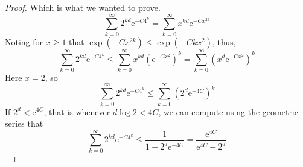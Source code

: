 \documentclass[a4paper,oneside,10pt]{amsproc}
\theoremstyle{remark}
\renewcommand{\leq}{\leqslant}
\renewcommand{\leq}{\leqslant}
\renewcommand{\geq}{\geqslant}
\newcommand{\e}{\mathrm{e}} %
\renewcommand{\leq}{\leqslant}%
\renewcommand{\geq}{\geqslant}%
\begin{document}
\begin{proof}
  Which is what we wanted to prove.
  \begin{equation*}
    \sum_{k = 0}^\infty 2^{kd} \e^{-C 4^k} = \sum_{k = 0}^\infty x^{kd} \e^{-C x^{2k}}
  \end{equation*}
  Noting for $x \geq 1$ that $\exp(-C x^{2k}) \leq \exp(-C k x^2)$,
  thus,
  \begin{equation*}
    \sum_{k = 0}^\infty 2^{kd} \e^{-C 4^k} \leq \sum_{k = 0}^\infty
    x^{kd} (\e^{-C x^2})^k = \sum_{k = 0}^\infty (x^{d} \e^{-C x^2})^k
  \end{equation*}
  Here $x = 2$, so
  \begin{equation*}
    \sum_{k = 0}^\infty 2^{kd} \e^{-C 4^k} \leq \sum_{k = 0}^\infty
    (2^d \e^{-4 C})^k
  \end{equation*}
  If $2^d < \e^{4C}$, that is whenever $d \log 2 < 4C$, we can compute
  using the geometric series that
  \begin{equation*}
    \sum_{k = 0}^\infty 2^{kd} \e^{-C 4^k} \leq \frac1{1 - 2^d
      \e^{-4C}} = \frac{\e^{4C}}{\e^{4C} - 2^d}
  \end{equation*}


\end{proof}

\printbibliography
\end{document}
